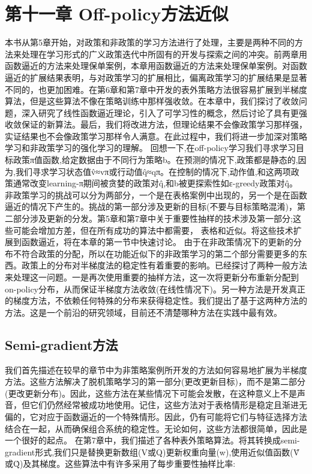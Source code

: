 \chapter{第十一章  Off-policy方法近似}
\begin{summary}
	
	本书从第5章开始，对政策和非政策的学习方法进行了处理，主要是两种不同的方法来处理在学习形式的广义政策迭代中所固有的开发与探索之间的冲突。前两章用函数逼近的方法来处理保单案例，本章用函数逼近的方法来处理保单案例。对函数逼近的扩展结果表明，与对政策学习的扩展相比，偏离政策学习的扩展结果是显著不同的，也更加困难。在第6章和第7章中开发的表外策略方法很容易扩展到半梯度算法，但是这些算法不像在策略训练中那样强收敛。在本章中，我们探讨了收敛问题，深入研究了线性函数逼近理论，引入了可学习性的概念，然后讨论了具有更强收敛保证的新算法。最后，我们将改进方法，但理论结果不会像政策学习那样强，实证结果也不会像政策学习那样令人满意。在此过程中，我们将进一步加深对策略学习和非政策学习的强化学习的理解。
	回想一下,在off-policy学习我们寻求学习目标政策π值函数,给定数据由于不同行为策略b。在预测的情况下,政策都是静态的,因为,我们寻求学习状态值v̂≈vπ或行动值q̂≈qπ。在控制的情况下,动作值,和这两项政策通常改变learning-π期间被贪婪的政策对q̂,和b被更探索性如ε-greedy政策对q̂。
	非政策学习的挑战可以分为两部分，一个是在表格案例中出现的，另一个是在函数逼近的情况下产生的。挑战的第一部分涉及更新的目标(不要与目标策略混淆)，第二部分涉及更新的分发。第5章和第7章中关于重要性抽样的技术涉及第一部分;这些可能会增加方差，但在所有成功的算法中都需要，
	表格和近似。将这些技术扩展到函数逼近，将在本章的第一节中快速讨论。
	由于在非政策情况下的更新的分布不符合政策的分配，所以在功能近似下的非政策学习的第二个部分需要更多的东西。政策上的分布对半梯度法的稳定性有着重要的影响。已经探讨了两种一般方法来处理这一问题。一是再次使用重要的抽样方法，这一次将更新分布重新分配到on-policy分布，从而保证半梯度方法收敛(在线性情况下)。另一种方法是开发真正的梯度方法，不依赖任何特殊的分布来获得稳定性。我们提出了基于这两种方法的方法。这是一个前沿的研究领域，目前还不清楚哪种方法在实践中最有效。
	
		
\end{summary}

\section{Semi-gradient方法}

我们首先描述在较早的章节中为非策略案例所开发的方法如何容易地扩展为半梯度方法。这些方法解决了脱机策略学习的第一部分(更改更新目标)，而不是第二部分(更改更新分布)。因此，这些方法在某些情况下可能会发散，在这种意义上不是声音，但它们仍然经常被成功地使用。记住，这些方法对于表格情形是稳定且渐进无偏的，它对应于函数逼近的一个特殊情形。因此，仍有可能将它们与特征选择方法结合在一起，从而确保组合系统的稳定性。无论如何，这些方法都很简单，因此是一个很好的起点。
在第7章中，我们描述了各种表外策略算法。将其转换成semi-gradient形式,我们只是替换更新数组(V或Q)更新权重向量(w),使用近似值函数(V̂或Q̂)及其梯度。这些算法中有许多采用了每步重要性抽样比率:
 
